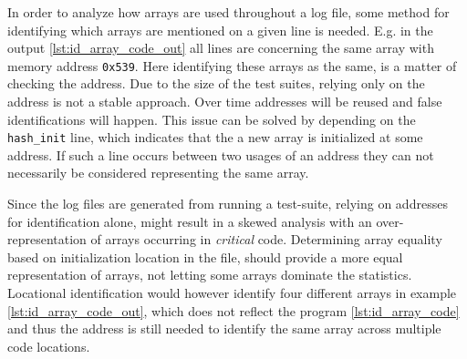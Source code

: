 In order to analyze how arrays are used throughout a log file, some method for identifying which arrays are mentioned on a given line is needed. E.g. in the output \ref{lst:id_array_code_out} all lines are concerning the same array with memory address \texttt{0x539}. Here identifying these arrays as the same, is a matter of checking the address. Due to the size of the test suites, relying only on the address is not a stable approach. Over time addresses will be reused and false identifications will happen. This issue can be solved by depending on the \texttt{hash\_init} line, which indicates that the a new array is initialized at some address. If such a line occurs between two usages of an address they can not necessarily be considered representing the same array. 

Since the log files are generated from running a test-suite, relying on addresses for identification alone, might result in a skewed analysis with an over-representation of arrays occurring in \emph{critical} code. Determining array equality based on initialization location in the file, should provide a more equal representation of arrays, not letting some arrays dominate the statistics. Locational identification would however identify four different arrays in example \ref{lst:id_array_code_out}, which does not reflect the program \ref{lst:id_array_code} and thus the address is still needed to identify the same array across multiple code locations.

